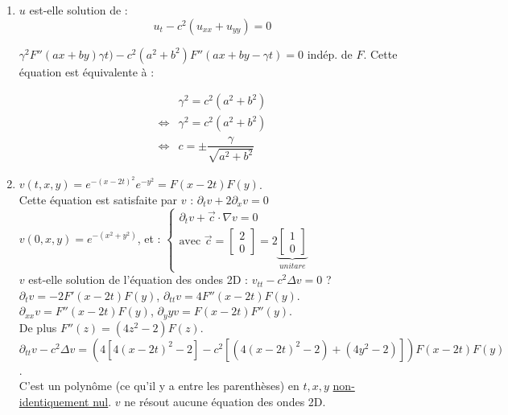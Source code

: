 \documentclass[12pt,a4paper]{article}
\begin{document}
\begin{sol}
\begin{enumerate}
	\item $u$ est-elle solution de :
	\[
		u_{t} - c^2(u_{xx}+u_{yy}) = 0
	\]
	\begin{minipage}{16cm}
		$\gamma^2F''(ax+by)\gamma t) - c^2(a^2 + b^2)F''(ax+by-\gamma t) = 0$ indép. de $F$. Cette équation est équivalente à :
		
		\[
			\begin{aligned}
				& \gamma^2 = c^2(a^2+b^2) \\
				\iff & \gamma^2 = c^2(a^2+b^2)\\
				\iff & c = \pm \dfrac{\gamma}{\sqrt{a^2+b^2}}
			\end{aligned}
		\]
	\end{minipage}
	
	
	\item  $v(t,x,y) = e^{-(x-2t)^2}e^{-y^2} = F(x-2t)F(y)$.\\
	Cette équation est satisfaite par $v$ : $\partial_t v + 2 \partial_x v = 0$\\
	$v(0,x,y) = e^{-(x^2+y^2)}$, et : $\begin{cases}
		\partial_t v + \vec c \cdot \nabla v = 0\\
		\text{avec } \vec c = \begin{bmatrix}
			2 \\ 0
		\end{bmatrix} = 2\underbrace{\begin{bmatrix}
		1 \\
		0
		\end{bmatrix}}_{unitare}
	\end{cases}$\\
	$v$ est-elle solution de l'équation des ondes 2D : $v_{tt} - c^2 \Delta v = 0$ ?\\
	$\partial_ t v = -2F'(x-2t)F(y)$, $\partial_{tt} v = 4F''(x-2t)F(y)$.\\
	$\partial_{xx} v = F''(x-2t)F(y)$, $\partial_yy v = F(x-2t)F''(y)$.\\
	De plus $F''(z) = (4z^2-2)F(z)$.\\
	$\partial_{tt} v - c^2 \Delta v = \left(4\left[4(x-2t)^2-2\right]-c^2\left[(4(x-2t)^2-2)+(4y^2-2)\right]\right)F(x-2t)F(y)$.\\
	C'est un polynôme (ce qu'il y a entre les parenthèses) en $t,x,y$ \underline{non-identiquement nul}. $v$ ne résout aucune équation des ondes 2D.
		\end{enumerate}
	\end{sol}
	
\end{document}
